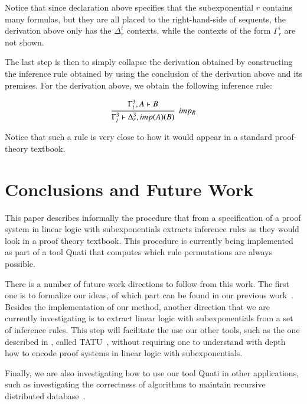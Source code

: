 \documentclass[a4paper,10pt]{article}
\begin{document}
Notice that since declaration above specifies that the subexponential $r$ contains
many formulas, but they are all placed to the right-hand-side of sequents, the derivation 
above only has the $\Delta_r^i$ contexts, while the contexts of the form $\Gamma_r^i$ are not
shown.

The last step is then to simply collapse the derivation obtained by constructing the 
inference rule obtained by using the conclusion of the derivation above and its premises. 
For the derivation above, we obtain the following inference rule:

{\small \[\cfrac{\Gamma_{l}^{3}, A  \vdash B }
{\Gamma_{l}^{3}  \vdash \Delta_{r}^{3}, imp (A) (B)  } \;\; imp_{R}\]}

Notice that such a rule is very close to how it would appear in a standard proof-theory 
textbook.

\section{Conclusions and Future Work}

This paper describes informally the procedure that from a specification of a proof system in 
linear logic with subexponentials extracts inference rules as they would look in a proof theory
textbook. This procedure is currently being implemented as part of a tool Quati that computes 
which rule permutations are always possible.

There is a number of future work directions to follow from this work. The first one is to 
formalize our ideas, of which part can be found in our previous work~\cite{nigam13iclp}. Besides
the implementation of our method, another
direction that we are currently investigating is to extract linear logic with subexponentials from 
a set of inference rules. This step will facilitate the use our other tools, such as the one described
in \cite{nigam.jlc}, called TATU~\cite{tatu}, without requiring one to understand with depth how to 
encode proof systems in linear logic with subexponentials.

Finally, we are also investigating how to use our tool Quati in other applications, such as investigating
the correctness of algorithms to maintain recursive distributed database~\cite{nigam12comlan}.



\end{document}
